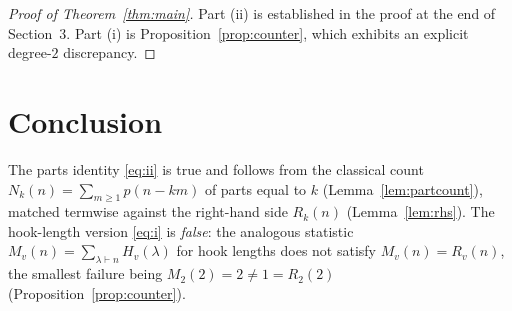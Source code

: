 \documentclass[12pt]{article}
\theoremstyle{definition}
\begin{document}
\begin{proof}[Proof of Theorem~\ref{thm:main}]
Part (ii) is established in the proof at the end of Section~3. Part (i) is
Proposition~\ref{prop:counter}, which exhibits an explicit degree-$2$ discrepancy.
\end{proof}

\section{Conclusion}

The parts identity \eqref{eq:ii} is true and follows from the classical count
$N_k(n)=\sum_{m\ge1}p(n-km)$ of parts equal to $k$ (Lemma~\ref{lem:partcount}),
matched termwise against the right-hand side $R_k(n)$ (Lemma~\ref{lem:rhs}). The
hook-length version \eqref{eq:i} is \emph{false}: the analogous statistic
$M_v(n)=\sum_{\lambda\vdash n}H_v(\lambda)$ for hook lengths does not satisfy
$M_v(n)=R_v(n)$, the smallest failure being $M_2(2)=2\ne1=R_2(2)$
(Proposition~\ref{prop:counter}).
\end{document}
